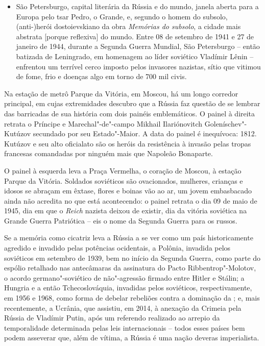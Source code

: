 \begin{itemize}
e alemão, se chamava Königsberg, local de nascimento e morte do filósofo
Immanuel Kant.
\item
São Petersburgo, capital literária da Rússia e do mundo, janela aberta
para a Europa pelo tsar Pedro, o Grande, e, segundo o homem do subsolo,
(anti-)herói dostoievskiano da obra \emph{Memórias do subsolo}, a cidade
mais abstrata {[}porque reflexiva{]} do mundo. Entre 08 de setembro de
1941 e 27 de janeiro de 1944, durante a Segunda Guerra Mundial, São
Petersburgo -- então batizada de Leningrado, em homenagem ao líder
soviético Vladímir Lênin -- enfrentou um terrível cerco imposto pelos
invasores nazistas, sítio que vitimou de fome, frio e doenças algo em
torno de 700 mil civis.
\end{itemize}

Na estação de metrô Parque da Vitória, em Moscou, há um longo corredor
principal, em cujas extremidades descubro que a Rússia faz questão de se
lembrar das barricadas de sua história com dois painéis emblemáticos. O
painel à direita retrata o Príncipe e Marechal"-de"-campo Mikhail
Ilariónovitch Goleníschev"-Kutúzov secundado por seu Estado"-Maior. A data
do painel é inequívoca: 1812. Kutúzov e seu alto oficialato são os
heróis da resistência à invasão pelas tropas francesas comandadas por
ninguém mais que Napoleão Bonaparte.

O painel à esquerda leva a Praça Vermelha, o coração de Moscou, à
estação Parque da Vitória. Soldados soviéticos são ovacionados,
mulheres, crianças e idosos se abraçam em êxtase, flores e boinas vão ao
ar, um jovem embasbacado ainda não acredita no que está acontecendo: o
painel retrata o dia 09 de maio de 1945, dia em que o  \emph{Reich}
nazista deixou de existir, dia da vitória soviética na Grande Guerra
Patriótica -- eis o nome da Segunda Guerra para os russos.

Se a memória como cicatriz leva a Rússia a se ver como um país
historicamente agredido e invadido pelas potências ocidentais, a
Polônia, invadida pelos soviéticos em setembro de 1939, bem no início da
Segunda Guerra, como parte do espólio retalhado nas antecâmaras da
assinatura do Pacto Ribbentrop"-Molotov, o acordo germano"-soviético de
não"-agressão firmado entre Hitler e Stálin; a Hungria e a então
Tchecoslováquia, invadidas pelos soviéticos, respectivamente, em 1956 e
1968, como forma de debelar rebeliões contra a dominação da ; e,
mais recentemente, a Ucrânia, que assistiu, em 2014, à anexação da
Crimeia pela Rússia de Vladímir Putin, após um referendo realizado ao
arrepio da temporalidade determinada pelas leis internacionais -- todos
esses países bem podem asseverar que, além de vítima, a Rússia é uma
nação deveras imperialista.

